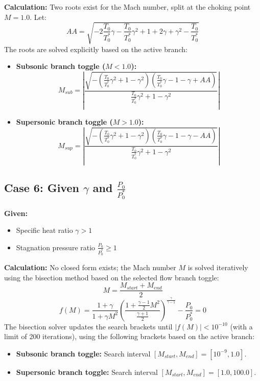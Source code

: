 \textbf{Calculation:} Two roots exist for the Mach number, split at the choking point $M = 1.0$. Let:
\begin{equation}
AA = \sqrt{-2\frac{T_0}{T_0^*}\gamma - \frac{T_0}{T_0^*}\gamma^2 + 1 + 2\gamma + \gamma^2 - \frac{T_0}{T_0^*}}
\end{equation}
The roots are solved explicitly based on the active branch:
\begin{itemize}
    \item \textbf{Subsonic branch toggle ($M < 1.0$):}
    \begin{equation}
    M_{sub} = \left|\frac{\sqrt{-\left(\frac{T_0}{T_0^*}\gamma^2+1-\gamma^2\right)\left(\frac{T_0}{T_0^*}\gamma - 1-\gamma+AA\right)}}{\frac{T_0}{T_0^*}\gamma^2+1-\gamma^2}\right|
    \end{equation}
    \item \textbf{Supersonic branch toggle ($M > 1.0$):}
    \begin{equation}
    M_{sup} = \left|\frac{\sqrt{-\left(\frac{T_0}{T_0^*}\gamma^2+1-\gamma^2\right)\left(\frac{T_0}{T_0^*}\gamma - 1-\gamma-AA\right)}}{\frac{T_0}{T_0^*}\gamma^2+1-\gamma^2}\right|
    \end{equation}
\end{itemize}


\subsection*{Case 6: Given $\gamma$ and $\frac{P_0}{P_0^*}$}

\textbf{Given:}
\begin{itemize}[nosep]
    \item Specific heat ratio $\gamma > 1$
    \item Stagnation pressure ratio $\frac{P_0}{P_0^*} \ge 1$
\end{itemize}

\textbf{Calculation:} No closed form exists; the Mach number $M$ is solved iteratively using the bisection method based on the selected flow branch toggle:
\begin{equation}
M = \frac{M_{start}+M_{end}}{2}
\end{equation}
\begin{equation}
f(M) = \frac{1+\gamma}{1+\gamma M^2}\left(\frac{1+\frac{\gamma-1}{2}M^2}{\frac{\gamma+1}{2}}\right)^{\frac{\gamma}{\gamma-1}} - \frac{P_0}{P_0^*} = 0
\end{equation}
The bisection solver updates the search brackets until $|f(M)| < 10^{-10}$ (with a limit of 200 iterations), using the following brackets based on the active branch:
\begin{itemize}[nosep]
    \item \textbf{Subsonic branch toggle:} Search interval $[M_{start}, M_{end}] = [10^{-9}, 1.0]$.
    \item \textbf{Supersonic branch toggle:} Search interval $[M_{start}, M_{end}] = [1.0, 100.0]$.
\end{itemize}



